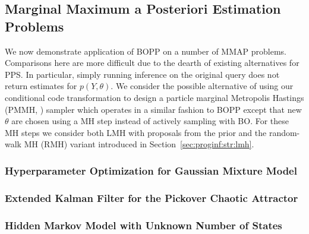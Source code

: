 \subsection{Marginal Maximum a Posteriori Estimation Problems}

We now demonstrate application of BOPP on a number of MMAP problems.  Comparisons here are more difficult due to the dearth of existing alternatives for PPS.  In particular, simply running inference on the original query does not return estimates for $p\left(Y,\theta\right)$.  We consider the possible alternative of using our conditional code transformation to design a particle marginal Metropolis Hastings (PMMH, \cite{andrieu2010particle}) sampler which operates in a similar fashion to BOPP except that new $\theta$ are chosen using a MH step instead of actively sampling with BO.
For these MH steps we consider both LMH \citep{wingate2011lightweight} with proposals from the prior and the random-walk MH (RMH) variant introduced in Section~\ref{sec:proginf:str:lmh}.

\subsubsection{Hyperparameter Optimization for Gaussian Mixture Model}



\subsubsection{Extended Kalman Filter for the Pickover Chaotic Attractor}
\label{sec:AppKalman}



\subsubsection{Hidden Markov Model with Unknown Number of States}


